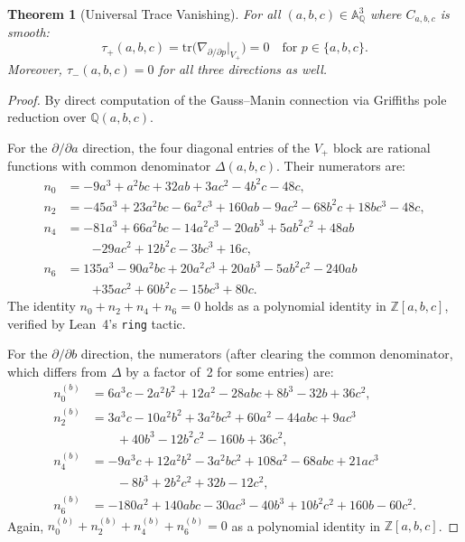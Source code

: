 \documentclass[11pt,a4paper]{article}
\newtheorem{theorem}{Theorem}[section]
\theoremstyle{definition}
\theoremstyle{remark}
\newcommand{\ZZ}{\mathbb{Z}}
\newcommand{\QQ}{\mathbb{Q}}
\newcommand{\Aff}{\mathbb{A}}
\newcommand{\tr}{\mathrm{tr}}
\begin{document}
\begin{theorem}[Universal Trace Vanishing]\label{thm:trace-vanishing}
For all $(a,b,c) \in \Aff^3_\QQ$ where $C_{a,b,c}$ is smooth:
\[
  \tau_+(a,b,c) = \tr\bigl(\nabla_{\partial/\partial p}\big|_{V_+}\bigr) = 0
  \quad \text{for } p \in \{a, b, c\}.
\]
Moreover, $\tau_-(a,b,c) = 0$ for all three directions as well.
\end{theorem}

\begin{proof}
By direct computation of the Gauss--Manin connection via Griffiths pole
reduction over $\QQ(a,b,c)$.

For the $\partial/\partial a$ direction, the four diagonal entries of
the $V_+$ block are rational functions with common denominator
$\Delta(a,b,c)$.
Their numerators are:
\begin{align*}
  n_0 &= {-9a^3 + a^2bc + 32ab + 3ac^2 - 4b^2c - 48c}, \\
  n_2 &= {-45a^3 + 23a^2bc - 6a^2c^3 + 160ab - 9ac^2 - 68b^2c + 18bc^3 - 48c}, \\
  n_4 &= {-81a^3 + 66a^2bc - 14a^2c^3 - 20ab^3 + 5ab^2c^2 + 48ab} \\
      &\qquad {- 29ac^2 + 12b^2c - 3bc^3 + 16c}, \\
  n_6 &= {135a^3 - 90a^2bc + 20a^2c^3 + 20ab^3 - 5ab^2c^2 - 240ab} \\
      &\qquad {+ 35ac^2 + 60b^2c - 15bc^3 + 80c}.
\end{align*}
The identity $n_0 + n_2 + n_4 + n_6 = 0$ holds as a polynomial identity
in $\ZZ[a,b,c]$, verified by Lean~4's \texttt{ring} tactic.

For the $\partial/\partial b$ direction, the numerators (after clearing
the common denominator, which differs from $\Delta$ by a factor of~2
for some entries) are:
\begin{align*}
  n_0^{(b)} &= 6a^3c - 2a^2b^2 + 12a^2 - 28abc + 8b^3 - 32b + 36c^2, \\
  n_2^{(b)} &= 3a^3c - 10a^2b^2 + 3a^2bc^2 + 60a^2 - 44abc + 9ac^3 \\
      &\qquad + 40b^3 - 12b^2c^2 - 160b + 36c^2, \\
  n_4^{(b)} &= -9a^3c + 12a^2b^2 - 3a^2bc^2 + 108a^2 - 68abc + 21ac^3 \\
      &\qquad - 8b^3 + 2b^2c^2 + 32b - 12c^2, \\
  n_6^{(b)} &= -180a^2 + 140abc - 30ac^3 - 40b^3 + 10b^2c^2 + 160b - 60c^2.
\end{align*}
Again, $n_0^{(b)} + n_2^{(b)} + n_4^{(b)} + n_6^{(b)} = 0$ as a
polynomial identity in $\ZZ[a,b,c]$.


\end{proof}
\end{document}
